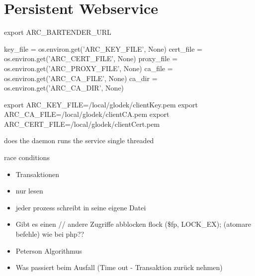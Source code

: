 \chapter{Persistent Webservice}




export ARC\_BARTENDER\_URL


    key\_file = os.environ.get('ARC\_KEY\_FILE', None)
    cert\_file = os.environ.get('ARC\_CERT\_FILE', None)
    proxy\_file = os.environ.get('ARC\_PROXY\_FILE', None)
    ca\_file = os.environ.get('ARC\_CA\_FILE', None)
    ca\_dir = os.environ.get('ARC\_CA\_DIR', None)

export ARC\_KEY\_FILE=/local/glodek/clientKey.pem
export ARC\_CA\_FILE=/local/glodek/clientCA.pem
export ARC\_CERT\_FILE=/local/glodek/clientCert.pem

does the daemon runs the service single threaded

race conditions
\begin{itemize}
 \item Transaktionen
 \item nur lesen
 \item jeder prozess schreibt in seine eigene Datei
 \item Gibt es einen     // andere Zugriffe abblocken
    flock (\$fp, LOCK\_EX);  (atomare befehle)
 	wie bei php??
 \item Peterson Algorithmus
 \item Was passiert beim Ausfall (Time out - Transaktion zurück nehmen)
\end{itemize}




